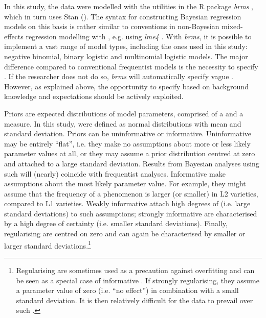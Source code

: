 In this study, the data were modelled with the utilities in the R package \textit{brms} \citep{Bürkner2020}, which in turn uses Stan (\citealt{StanDevelopmentTeam2011}). The syntax for constructing Bayesian regression models on this basis is rather similar to conventions in non-Bayesian mixed-effects regression modelling with , e.g. using \textit{lme4} \citep{BatesEtAl2020}. With \textit{brms}, it is possible to implement a vast range of model types, including the ones used in this study: negative binomial, binary logistic and multinomial logistic models. The major difference compared to conventional frequentist models is the necessity to specify . If the researcher does not do so, \textit{brms} will automatically specify vague . However, as explained above, the opportunity to specify  based on background knowledge and expectations should be actively exploited.

Priors are expected distributions of model parameters, comprised of a  and a  measure. In this study,  were defined as normal distributions with mean and standard deviation. Priors can be uninformative or informative. Uninformative  may be entirely “flat”, i.e. they make no assumptions about more or less likely parameter values at all, or they may assume a prior distribution centred at zero and attached to a large standard deviation. Results from Bayesian analyses using such  will (nearly) coincide with frequentist analyses. Informative  make assumptions about the most likely parameter value. For example, they might assume that the frequency of a phenomenon is larger (or smaller) in L2 varieties, compared to L1 varieties. Weakly informative  attach high degrees of  (i.e. large standard deviations) to such assumptions; strongly informative  are characterised by a high degree of certainty (i.e. smaller standard deviations). Finally, regularising  are centred on zero and can again be characterised by smaller or larger standard deviations.\footnote{Regularising  are sometimes used as a precaution against overfitting and can be seen as a special case of informative . If strongly regularising, they assume a parameter value of zero (i.e. “no effect”) in combination with a small standard deviation. It is then relatively difficult for the data to prevail over such .}

